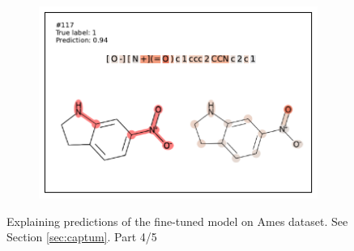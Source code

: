 \begin{figure}
\begin{subfigure}[b]{0.33\textwidth}
\end{subfigure}\begin{subfigure}[b]{0.33\textwidth} 
  \centering 
  \includegraphics[width=\textwidth]{figures/ames/ames117.pdf} 
\end{subfigure} 
\caption{Explaining predictions of the fine-tuned model on Ames dataset. See Section \ref{sec:captum}. Part 4/5}
\label{fig:captum-ames-4}
\end{figure}

